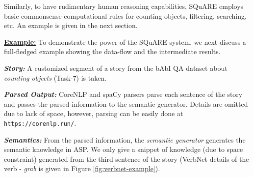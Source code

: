 \documentclass[letterpaper]{article}
\begin{document}
\smallskip\noindent 
Similarly, to have rudimentary human reasoning capabilities, SQuARE employs basic commonsense computational rules for counting objects, filtering, searching, etc. An example is given in the next section.  

\noindent\textbf{\underline{Example:}}
To demonstrate the power of the SQuARE system, we next discuss a full-fledged example showing the data-flow and the intermediate results.

\noindent \textit{\textbf{Story:} } A customized segment of a story from the bAbI QA dataset about \textit{counting objects} (Task-7) is taken.

\smallskip 
\noindent
\cprotect {}
    
\smallskip    
\noindent \textit{\textbf{Parsed Output: }} CoreNLP and spaCy parsers parse each sentence of the story and passes the parsed information to the semantic generator. Details are omitted due to lack of space, however, parsing can be easily done at \texttt{https://corenlp.run/}.

\noindent \textit{\textbf{Semantics: }} 
From the parsed information, the \textit{semantic generator} generates the semantic knowledge in ASP. We only give a snippet of knowledge (due to space constraint) generated from the third sentence of the story (VerbNet details of the verb - \textit{grab} is given in Figure \ref{fig:verbnet-example}).

\smallskip 
\noindent
\cprotect {}
\end{document}
